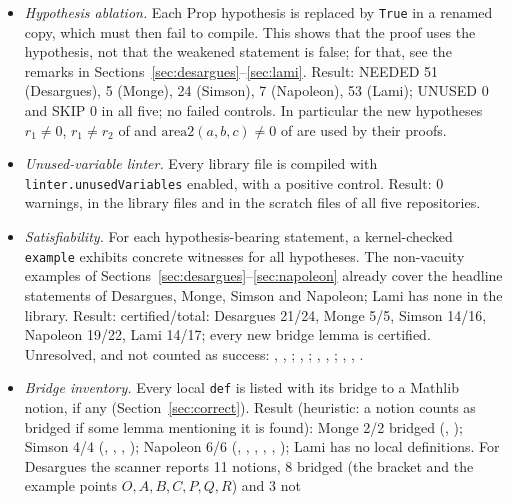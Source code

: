 \documentclass[11pt]{article}
\theoremstyle{definition}
\theoremstyle{remark}
\newcommand{\lean}[1]{\texttt{#1}}
\begin{document}
\begin{itemize}
14 (Lami), the remaining statements having no hypotheses; 0 found contradictory.
\item \emph{Hypothesis ablation.} Each Prop hypothesis is replaced by \lean{True} in a renamed copy,
which must then fail to compile. This shows that the proof uses the hypothesis, not that the
weakened statement is false; for that, see the remarks in Sections~\ref{sec:desargues}--\ref{sec:lami}.
Result: NEEDED 51 (Desargues), 5 (Monge), 24 (Simson), 7 (Napoleon), 53 (Lami); UNUSED 0 and
SKIP 0 in all five; no failed controls. In particular the new hypotheses $r_1\ne0$, $r_1\ne r_2$
of  and $\mathrm{area2}(a,b,c)\ne0$ of
 are used by their proofs.
\item \emph{Unused-variable linter.} Every library file is compiled with
\lean{linter.unusedVariables} enabled, with a positive control.
Result: 0 warnings, in the library files and in the scratch files of all five repositories.
\item \emph{Satisfiability.} For each hypothesis-bearing statement, a kernel-checked
\lean{example} exhibits concrete witnesses for all hypotheses. The non-vacuity examples of
Sections~\ref{sec:desargues}--\ref{sec:napoleon} already cover the headline statements of
Desargues, Monge, Simson and Napoleon; Lami has none in the library.
Result: certified/total: Desargues 21/24, Monge 5/5, Simson 14/16, Napoleon 19/22,
Lami 14/17; every new bridge lemma is certified. Unresolved, and not counted as success:
, ,
; ,
; , ,
; , ,
.
\item \emph{Bridge inventory.} Every local \lean{def} is listed with its bridge to a Mathlib notion,
if any (Section~\ref{sec:correct}).
Result (heuristic: a notion counts as bridged if some lemma mentioning it is found): Monge 2/2
bridged (, ); Simson 4/4 (,
, , ); Napoleon 6/6
(, , , ,
, ); Lami has no local definitions. For Desargues the scanner
reports 11 notions, 8 bridged (the bracket and the example points $O,A,B,C,P,Q,R$) and 3 not

\end{itemize}
\end{document}
